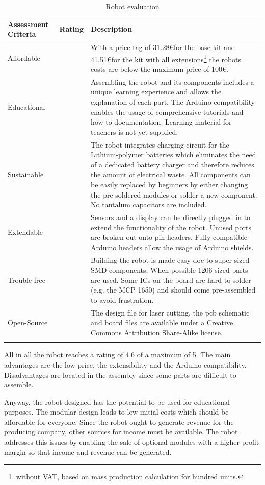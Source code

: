 \documentclass[11pt,a4paper]{article}
\newcounter{starnumber}
\newcommand{\stars}[1]{
  \forloop{starnumber}{1}{\value{starnumber} < 6}{
    \ifthenelse{#1 < \value{starnumber}}{\ding{73}}{\ding{72}}%
  }
}
\begin{document}
\begin{longtable}{p{}p{}p{}}
\toprule
Assessment Criteria    & Rating & Description \\
\midrule
Affordable      & \stars{5}    & With a price tag of 31.28\euro for the base kit and 41.51\euro for the kit with all extensions\footnote{without VAT, based on mass production calculation for hundred units.} the robots costs are below the maximum price of 100\euro.\\
Educational     & \stars{4}     & Assembling the robot and its components includes a unique learning experience and allows the explanation of each part. The Arduino compatibility enables the usage of comprehensive tutorials and how-to documentation. Learning material for teachers is not yet supplied. \\
Sustainable       & \stars{5}     &  The robot integrates charging circuit for the Lithium-polymer batteries which eliminates the need of a dedicated battery charger and therefore reduces the amount of electrical waste. All components can be easily replaced by beginners by either changing the pre-soldered modules or solder a new component. No tantalum capacitors are included.\\
Extendable & \stars{5}      &  Sensors and a display can be directly plugged in to extend the functionality of the robot. Unused ports are broken out onto pin headers. Fully compatible Arduino headers allow the usage of Arduino shields.\\
Trouble-free & \stars{4} & Building the robot is made easy doe to super sized SMD components. When possible 1206 sized parts are used. Some ICs on the board are hard to solder (e.g. the MCP 1650) and should come pre-assembled to avoid frustration.\\
Open-Source & \stars{5} & The design file for laser cutting, the pcb schematic and board files are available under a Creative Commons Attribution Share-Alike license.\\
\bottomrule
\caption{Robot evaluation}
\label{tbl:arduinorobot_eval}
\end{longtable}

All in all the robot reaches a rating of 4.6 of a maximum of 5. The main advantages are the low price, the extensibility and the Arduino compatibility. Disadvantages are located in the assembly since some parts are difficult to assemble.

Anyway, the robot designed has the potential to be used for educational purposes. The modular design leads to low initial costs which should be affordable for everyone. Since the robot ought to generate revenue for the producing company, other sources for income must be available. The robot addresses this issues by enabling the sale of optional modules with a higher profit margin so that income and revenue can be generated.
\end{document}
